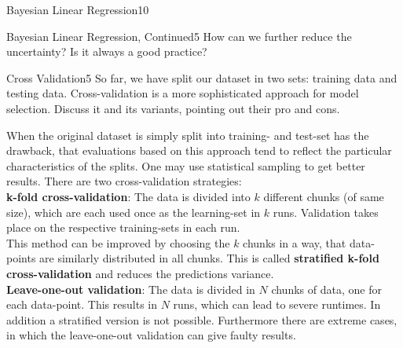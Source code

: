 \begin{questions}
\begin{question}{Bayesian Linear Regression}{10}
\begin{answer}
\end{answer}
\end{question}


\begin{question}{Bayesian Linear Regression, Continued}{5}
How can we further reduce the uncertainty? Is it always a good practice?

\begin{answer}\end{answer}
\end{question}


\begin{question}[bonus]{Cross Validation}{5}
So far, we have split our dataset in two sets: training data and testing data. Cross-validation is a more sophisticated approach for model selection. Discuss it and its variants, pointing out their pro and cons.
\end{question}

\begin{answer}
When the original dataset is simply split into training- and test-set has the drawback, that evaluations based on this approach tend to reflect the particular characteristics of the splits. One may use statistical sampling to get better results. There are two cross-validation strategies:\\
\textbf{k-fold cross-validation}: The data is divided into $k$ different chunks (of same size), which are each used once as the learning-set in $k$ runs. Validation takes place on the respective training-sets in each run.\\
This method can be improved by choosing the $k$ chunks in a way, that data-points are similarly distributed in all chunks. This is called \textbf{stratified k-fold cross-validation} and reduces the predictions variance. \\
\textbf{Leave-one-out validation}: The data is divided in $N$ chunks of data, one for each data-point. This results in $N$ runs, which can lead to severe runtimes. In addition a stratified version is not possible. Furthermore there are extreme cases, in which the leave-one-out validation can give faulty results.
\end{answer}

\end{questions}
